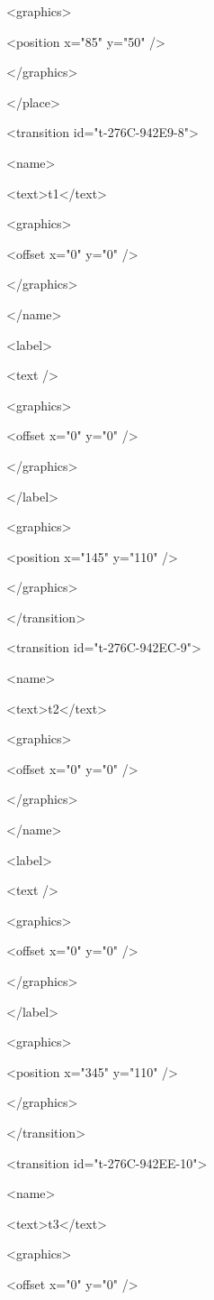     <graphics>

     <position x="85" y="50" />

    </graphics>

   </place>

   <transition id="t-276C-942E9-8">

    <name>

     <text>t1</text>

     <graphics>

      <offset x="0" y="0" />

     </graphics>

    </name>

    <label>

     <text />

     <graphics>

      <offset x="0" y="0" />

     </graphics>

    </label>

    <graphics>

     <position x="145" y="110" />

    </graphics>

   </transition>

   <transition id="t-276C-942EC-9">

    <name>

     <text>t2</text>

     <graphics>

      <offset x="0" y="0" />

     </graphics>

    </name>

    <label>

     <text />

     <graphics>

      <offset x="0" y="0" />

     </graphics>

    </label>

    <graphics>

     <position x="345" y="110" />

    </graphics>

   </transition>

   <transition id="t-276C-942EE-10">

    <name>

     <text>t3</text>

     <graphics>

      <offset x="0" y="0" />


